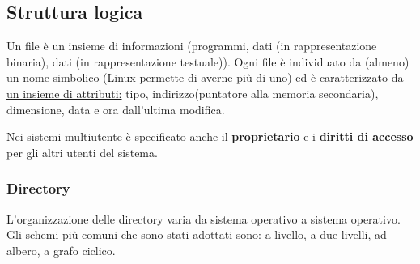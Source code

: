 \documentclass{article}
\begin{document}
\subsection{Struttura logica}
\noindent Un file è un insieme di informazioni (programmi, dati 
(in rappresentazione binaria), dati (in rappresentazione testuale)).
Ogni file è individuato da (almeno) un nome simbolico 
(Linux permette di averne più di uno) ed è
 \underline{caratterizzato da un insieme di attributi:}
tipo, indirizzo(puntatore alla memoria secondaria), dimensione,
data e ora dall'ultima modifica.

\noindent Nei sistemi multiutente è specificato anche il \textbf{proprietario}
e i \textbf{diritti di accesso} per gli altri utenti del sistema.

\noindent {} 
\medskip

\subsubsection{Directory}
\noindent L'organizzazione delle directory varia da sistema operativo a
sistema operativo. Gli schemi più comuni che sono stati adottati sono:
a livello, a due livelli, ad albero, a grafo ciclico.
\medskip
\end{document}
